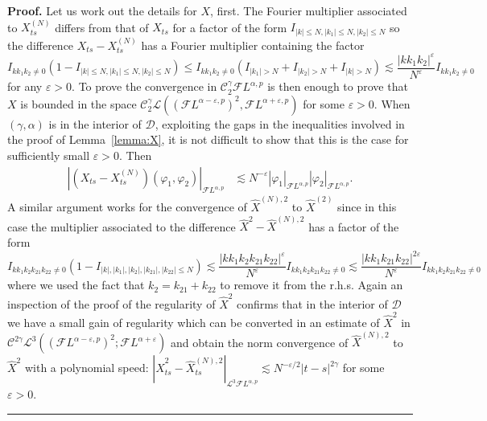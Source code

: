 \documentclass[a4paper,11pt,reqno]{article}
\newcommand{\eps}{\varepsilon}
\newcommand{\CC}{\mathcal{C}}
\newcommand{\DD}{\mathcal{D}}
\newcommand{\FF}{\mathcal{F}}
\newcommand{\LL}{\mathcal{L}}
\newenvironment{proof}[1][Proof]{\textbf{#1.} }{\ \rule{0.5em}{0.5em}}
\begin{document}
\begin{proof}
Let us work out the details for $X$, first.
The Fourier multiplier associated to $X^{(N)}_{ts}$ differs from that of $X_{ts}$ for a factor of the form
$
I_{|k|\le N,|k_1|\le N,|k_2|\le N}
$ so the difference $X_{ts}-X^{(N)}_{ts}$ has a Fourier multiplier containing the factor
$$
I_{kk_1k_2 \neq 0}(1-I_{|k|\le N,|k_1|\le N,|k_2|\le N}) \le I_{kk_1k_2 \neq 0}( I_{|k_1| > N}+I_{|k_2| > N}+I_{|k| > N} )\lesssim \frac{|k k_1 k_2|^\eps}{N^\eps} I_{kk_1k_2 \neq 0}
$$
for any $\eps > 0$.
To prove the convergence in $\CC^\gamma_2 \FF L^{\alpha,p}$ is then enough to prove that $X$ is bounded in the space $\CC_2^\gamma \LL((\FF L^{\alpha-\eps,p})^2,\FF L^{\alpha+\eps,p})$ for some $\eps > 0$. When $(\gamma,\alpha)$ is in the interior of $\DD$, exploiting the gaps in the inequalities involved in the proof of Lemma~\ref{lemma:X}, it is not difficult to show that this is the case for sufficiently small $\eps > 0$.
Then
\begin{equation*}
  \begin{split}
 | (X_{ts}-X^{(N)}_{ts})(\varphi_1,\varphi_2)|_{{\FF L^{\alpha,p}}} & \lesssim N^{-\eps} |\varphi_1|_{{\FF L^{\alpha,p}}} |\varphi_2|_{{\FF L^{\alpha,p}}} .
  \end{split}
\end{equation*}
A similar argument works for the convergence of $\hat X^{(N),2}$ to $\hat X^{(2)}$  since in this case the multiplier associated to the difference $\hat X^2-\hat X^{(N),2}$ has a factor of the form
$$
I_{kk_1k_2 k_{21} k_{22} \neq 0}(1-I_{|k|,|k_1|,|k_2|,|k_{21}|,|k_{22}|\le N}) 
\lesssim \frac{|k k_1 k_2 k_{21} k_{22}|^\eps}{N^\eps} I_{kk_1k_2 k_{21} k_{22} \neq 0} 
\lesssim \frac{|k k_1 k_{21} k_{22}|^{2\eps}}{N^\eps} I_{kk_1k_2 k_{21} k_{22} \neq 0} 
$$
where we used the fact that $k_2 = k_{21}+k_{22}$ to remove it from the r.h.s. Again an inspection of the proof of the regularity of $\hat X^2$ confirms that in the interior of $\DD$ we have a small gain of regularity which can be converted in an estimate of $\hat X^2$ in $\CC^{2\gamma} \LL^3((\FF L^{\alpha-\eps,p})^2;\FF L^{\alpha+\eps})$ and obtain the norm convergence of $\hat X^{(N),2}$ to $\hat X^2$ with a polynomial speed:
$
 |\hat X^2_{ts}-\hat X^{(N),2}_{ts}|_{{\LL^3 \FF L^{\alpha,p}}} \lesssim N^{-\eps/2} |t-s|^{2\gamma}
$
for some $\eps > 0$.
\end{proof}
\end{document}

